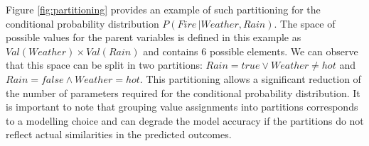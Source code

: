 Figure \ref{fig:partitioning} provides an example of such partitioning for the conditional probability distribution $P(\mathit{Fire} \, | \mathit{Weather}, \mathit{Rain})$.  The space of possible values for the parent variables is defined in this example as $Val(\mathit{Weather}) \times Val(\mathit{Rain})$ and contains 6 possible elements.  We can observe that this space can be split in two partitions: $\mathit{Rain}\!=\mathit{true} \lor \mathit{Weather}\!\neq\mathit{hot}$ and $\mathit{Rain}\!=\mathit{false} \land \mathit{Weather}\!=\mathit{hot}$. This partitioning allows a significant reduction of the number of parameters required for the conditional probability distribution.  It is important to note that grouping value assignments into partitions corresponds to a modelling choice and can degrade the model accuracy if the partitions do not reflect actual similarities in the predicted outcomes.



